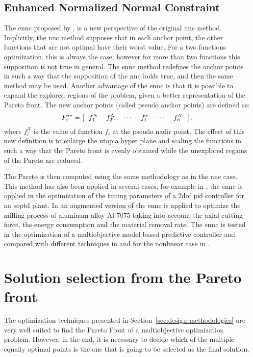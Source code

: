 \subsection{Enhanced Normalized Normal Constraint}
\label{sec:ENNC}
The \gls{ennc} proposed by \citet{Sanchis2008}, is a new perspective of the original \gls{nnc} method. Implicitly, the \gls{nnc} method supposes that in each anchor point, the other functions that are not optimal have their worst value. For a two functions optimization, this is always the case; however for more than two functions this supposition is not true in general. The \gls{ennc} method redefines the anchor points in such a way that the supposition of the \gls{nnc} holds true, and then the same method may be used. Another advantage of the \gls{ennc} is that it is possible to expand the explored regions of the problem, given a better representation of the Pareto front.
%
The new anchor points (called pseudo anchor points) are defined as:
\begin{equation}
F_i^{**} = \left[
\begin{tabular}{cccccc}
$f_1^N$ & $f_2^N$ & $\cdots$ & $f_i^{*}$ & $\cdots$ & $f_n^N$
\end{tabular}
\right],
\label{eq:PseudoAnchor}
\end{equation}
%
where $f_i^N$ is the value of function $f_i$ at the pseudo nadir point. The effect of this new definition is to enlarge the utopia hyper plane and scaling the functions in such a way that the Pareto front is evenly obtained while the unexplored regions of the Pareto are reduced.

The Pareto is then computed using the same methodology as in the \gls{nnc} case. This method has also been applied in several cases, for example in \citet{Contreras-Leiva2016}, the \gls{ennc} is applied in the optimization of the tuning parameters of a \gls{2dof} \gls{pid} controller for an \gls{soptd} plant. In \citet{Pereira2017b} an augmented version of the \gls{ennc} is applied to optimize the milling process of aluminum alloy Al 7075 taking into account the axial cutting force, the energy consumption and the material removal rate. The \gls{ennc} is tested in the optimization of a multiobjective model based predictive controller and compared with different techniques in \citet{Toro2011} and for the nonlinear case in \citet{Vallerio2014}.
\section{Solution selection from the Pareto front}
\label{sec:Selection}
The optimization techniques presented in Section~\ref{sec:design-methodologies} are very well suited to find the Pareto Front of a multiobjective optimization problem. However, in the end, it is necessary to decide which of the multiple equally optimal points is the one that is going to be selected as the final solution.

